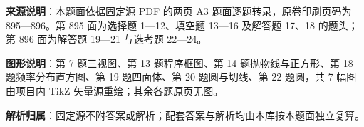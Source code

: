 

\begin{gknotice}
\textbf{来源说明}：本题面依据固定源 PDF 的两页 A3 题面逐题转录，原卷印刷页码为 895—896。第 895 面为选择题 1—12、填空题 13—16 及解答题 17、18 的题头；第 896 面为解答题 19—21 与选考题 22—24。

\textbf{图形说明}：第 7 题三视图、第 13 题程序框图、第 14 题抛物线与正方形、第 18 题频率分布直方图、第 19 题四面体、第 20 题圆与切线、第 22 题圆，共 7 幅图由项目内 TikZ 矢量源重绘；其余各题原页无图。

\textbf{解析归属}：固定源不附答案或解析；配套答案与解析均由本库按本题面独立复算。
\end{gknotice}


